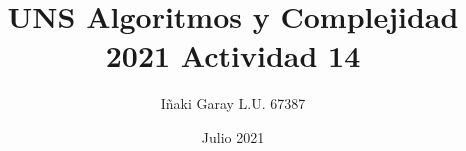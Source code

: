 \documentclass[12pt, a4paper]{article}
\title{UNS Algoritmos y Complejidad 2021 Actividad 14}
\author{Iñaki Garay L.U. 67387}
\date{Julio 2021}
\begin{document}
\maketitle

\begin{verbatim}

\end{verbatim}
\end{document}
